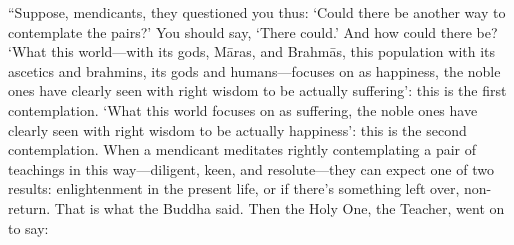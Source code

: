 \documentclass[12pt,openany]{book}%
\begin{document}
“Suppose, mendicants, they questioned you thus: ‘Could there be another way to contemplate the pairs?’ You should say, ‘There could.’ And how could there be? ‘What this world—with its gods, \textsanskrit{Māras}, and \textsanskrit{Brahmās}, this population with its ascetics and brahmins, its gods and humans—focuses on as happiness, the noble ones have clearly seen with right wisdom to be actually suffering’: this is the first contemplation. ‘What this world focuses on as suffering, the noble ones have clearly seen with right wisdom to be actually happiness’: this is the second contemplation. When a mendicant meditates rightly contemplating a pair of teachings in this way—diligent, keen, and resolute—they can expect one of two results: enlightenment in the present life, or if there’s something left over, non-return. That is what the Buddha said. Then the Holy One, the Teacher, went on to say: 
\end{document}
